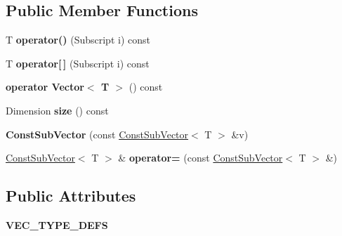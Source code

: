 \subsection*{Public Member Functions}
\begin{DoxyCompactItemize}
\item 
\mbox{\label{classTLAS_1_1ConstSubVector_a1849978296470dbb98243fc98de71b1b}} 
T {\bfseries operator()} (Subscript i) const
\item 
\mbox{\label{classTLAS_1_1ConstSubVector_a5a99e709bfa9737783c212f8793965fa}} 
T {\bfseries operator\mbox{[}$\,$\mbox{]}} (Subscript i) const
\item 
\mbox{\label{classTLAS_1_1ConstSubVector_a0d6d7c2c0b471ece68d3759e0774c057}} 
{\bfseries operator Vector$<$ T $>$} () const
\item 
\mbox{\label{classTLAS_1_1ConstSubVector_a5611a4a21dbfc649de757f51c9681a6b}} 
Dimension {\bfseries size} () const
\item 
\mbox{\label{classTLAS_1_1ConstSubVector_a5304fc461f1dcb4bb8d3e74cde085047}} 
{\bfseries Const\+Sub\+Vector} (const \hyperlink{classTLAS_1_1ConstSubVector}{Const\+Sub\+Vector}$<$ T $>$ \&v)
\item 
\mbox{\label{classTLAS_1_1ConstSubVector_a6d08e03330d9265b3900592541313a1e}} 
\hyperlink{classTLAS_1_1ConstSubVector}{Const\+Sub\+Vector}$<$ T $>$ \& {\bfseries operator=} (const \hyperlink{classTLAS_1_1ConstSubVector}{Const\+Sub\+Vector}$<$ T $>$ \&)
\end{DoxyCompactItemize}
\subsection*{Public Attributes}
\begin{DoxyCompactItemize}
\item 
\mbox{\label{classTLAS_1_1ConstSubVector_a966402cc19fadb2306554d63d7998b37}} 
{\bfseries V\+E\+C\+\_\+\+T\+Y\+P\+E\+\_\+\+D\+E\+FS}
\end{DoxyCompactItemize}
